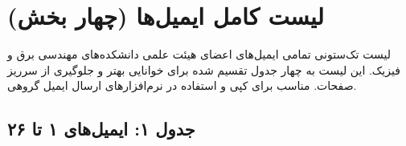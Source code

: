 \documentclass[10pt]{report}
\begin{document}
\clearpage
\chapter{لیست کامل ایمیل‌ها (چهار بخش)}

\begin{keyconceptbox}
لیست تک‌ستونی تمامی ایمیل‌های اعضای هیئت علمی دانشکده‌های مهندسی برق و فیزیک. این لیست به چهار جدول تقسیم شده برای خوانایی بهتر و جلوگیری از سرریز صفحات. مناسب برای کپی و استفاده در نرم‌افزارهای ارسال ایمیل گروهی.
\end{keyconceptbox}

\section{جدول ۱: ایمیل‌های ۱ تا ۲۶}
\end{document}
